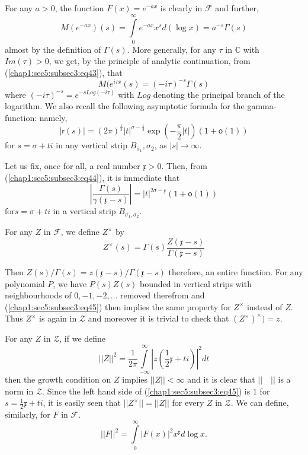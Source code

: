   For any $a>0$, the function $F(x)=e^{-ax}$ is clearly in
  $\mathscr{F}$ and further, 
\begin{equation*}
  M(e^{-ax})(s)=\int\limits_{0}^{\infty}e^{-ax}x^{s}d(\log
  x)=a^{-s}\Gamma(s)\tag{43}\label{chap1:sec5:subsec3:eq43} 
\end{equation*}
almost by the definition of $\Gamma(s)$. More generally, for any
$\tau$ in $\mathbb{C}$ with $Im(\tau)>0$, we get, by the principle of
analytic continuation, from  (\ref{chap1:sec5:subsec3:eq43}), that 
\begin{equation*}
  M(e^{i \tau x}(s)=(-i \tau)^{-s} \Gamma (s)
\end{equation*}
where $(-i\tau)^{-s}=e^{-s Log(-i \tau)}$ with $Log$ denoting the
principal branch of the logarithm. 
 We also recall the following asymptotic formula for the
 gamma-function: namely, 
\begin{equation*}
  |\mathsf{r}(s)|=(2\pi)^{\frac{1}{2}} |t|^{\sigma-\frac{1}{2}} \exp
  \left(-\frac{\pi}{2}|t|\right)
  (1+\mathsf{o}(1))\tag{44}\label{chap1:sec5:subsec3:eq44}  
\end{equation*}
for $s=\sigma+ti$ in any vertical strip $B_{\sigma_{1}}, \sigma_{2}$,
as $|s|\rightarrow \infty$. 

 Let us fix, once for all, a real number $\mathfrak{x}>0$. Then, from
 (\ref{chap1:sec5:subsec3:eq44}), it is immediate that
\begin{equation*}
  \left|\frac{\Gamma(s)}{\gamma(\mathfrak{x}-s)}\right| =
  |t|^{2\sigma-\mathfrak{x}}
  (1+\mathsf{o}(1))\tag{45}\label{chap1:sec5:subsec3:eq45} 
\end{equation*}
for\pageoriginale $s=\sigma+ti$  in a vertical strip $B_{\sigma_{1},\sigma_{2}}$.

 For any $Z$ in $\mathscr{F}$, we define $Z^\times $ by
\begin{equation*}
  Z^\times (s)=\Gamma(s)\frac{Z(\mathfrak{x}-s)}{\Gamma(\mathfrak{x}-s)}
\end{equation*}

Then $Z(s)/\Gamma(s)=z(\mathfrak{x}-s)/\Gamma(\mathfrak{x}-s)$ therefore,
an entire function. For any polynomial $P$, we have $P(s)Z(s)$ bounded
in vertical strips with neighbourhoods of $0,-1,-2,\ldots$ removed
therefrom and (\ref{chap1:sec5:subsec3:eq45}) then implies the same
property for $Z^\times $ 
instead of $Z$. Thus $Z^\times $ is again in $\mathscr{Z}$ and
moreover it is  trivial to check that $(Z^\times)^\times)=z$.

For any $Z$ in $\mathscr{Z}$, if we define 
\begin{equation*}
  ||Z||^{2}=\frac{1}{2\pi}\int\limits_{-\infty}^{\infty}
  \left|z(\frac{1}{2}\mathfrak{x}+ti)\right|^{2}dt
\end{equation*}
then the growth condition on $Z$ implies $||Z||<\infty$ and it is
clear that $||\quad||$ is a norm in $\mathscr{Z}$. Since the left hand
side of (\ref{chap1:sec5:subsec3:eq45}) is $1$ for
$s=\frac{1}{2}\mathfrak{x}+ti$, it is easily 
seen that $||Z^\times ||=||Z||$ for every $Z$ in $\mathscr{Z}$. We can
define, similarly, for $F$ in $\mathscr{F}$. 
\begin{equation*}
  ||F||^{2}=\int\limits_{0}^{\infty}|F(x)|^{2}x^{\mathfrak{x}}d \log x.
\end{equation*}

